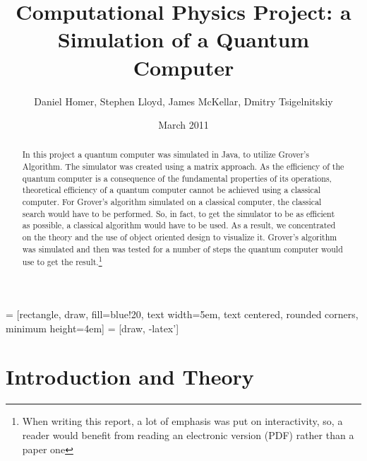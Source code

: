 \documentclass[12pt]{report}
\title{Computational Physics Project: a Simulation of a Quantum Computer}
\author{Daniel Homer, Stephen Lloyd, James McKellar, Dmitry Tsigelnitskiy}
\date{March 2011}
\begin{document}
\usetikzlibrary{shapes,arrows}


 = [rectangle, draw, fill=blue!20, 
    text width=5em, text centered, rounded corners, minimum height=4em]
 = [draw, -latex']

\maketitle

\begin{abstract}
In this project a quantum computer was simulated  in Java\cite{0}, to utilize Grover's Algorithm\cite{1}. The simulator was created using a matrix approach. As the efficiency of the quantum computer is a consequence of the fundamental properties of its operations, theoretical efficiency of a quantum computer cannot be achieved using a classical computer. For Grover's algorithm simulated on a classical computer, the classical search would have to be performed. So, in fact, to get the simulator to be as efficient as possible, a classical algorithm would have to be used. As a result, we concentrated on the theory and the use of object oriented design to visualize it. Grover's algorithm was simulated and then was tested for a number of steps the quantum computer would use to get the result.\footnote{When writing this report, a lot of emphasis was put on interactivity, so, a reader would benefit from reading an electronic version (PDF) rather than a paper one}
\end{abstract}

\tableofcontents

\chapter{Introduction and Theory}
\end{document}
